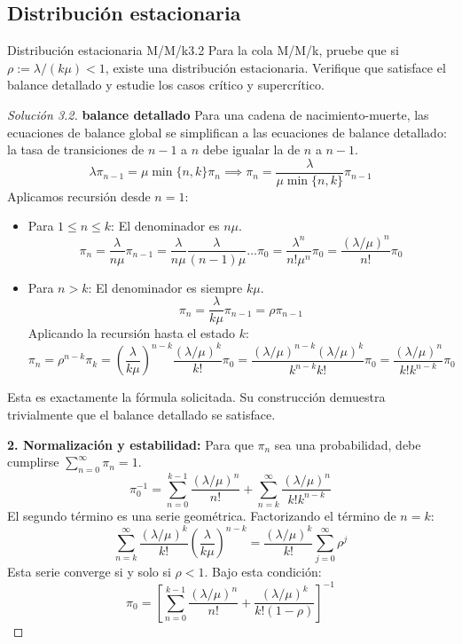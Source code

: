 \documentclass[10pt,a4paper]{article}
\begin{document}
\newpage
\subsection{Distribución estacionaria}

\begin{ejercicio}{Distribución estacionaria M/M/k}{3.2}
    Para la cola M/M/k, pruebe que si $\rho := \lambda/(k\mu) < 1$, existe una distribución estacionaria. Verifique que satisface el balance detallado y estudie los casos crítico y supercrítico.
\end{ejercicio}

\begin{proof}[Solución 3.2]
    \textbf{balance detallado}
    Para una cadena de nacimiento-muerte, las ecuaciones de balance global se simplifican a las ecuaciones de balance detallado: la tasa de transiciones de $n-1$ a $n$ debe igualar la de $n$ a $n-1$.
    \[ \lambda \pi_{n-1} = \mu \min\{n, k\} \pi_n \implies \pi_n = \frac{\lambda}{\mu \min\{n, k\}} \pi_{n-1} \]
    Aplicamos recursión desde $n=1$:
    \begin{itemize}
        \item Para $1 \le n \le k$: El denominador es $n\mu$.
        \[ \pi_n = \frac{\lambda}{n\mu} \pi_{n-1} = \frac{\lambda}{n\mu} \frac{\lambda}{(n-1)\mu} \dots \pi_0 = \frac{\lambda^n}{n! \mu^n} \pi_0 = \frac{(\lambda/\mu)^n}{n!} \pi_0 \]
        \item Para $n > k$: El denominador es siempre $k\mu$.
        \[ \pi_n = \frac{\lambda}{k\mu} \pi_{n-1} = \rho \pi_{n-1} \]
        Aplicando la recursión hasta el estado $k$:
        \[ \pi_n = \rho^{n-k} \pi_k = \left( \frac{\lambda}{k\mu} \right)^{n-k} \frac{(\lambda/\mu)^k}{k!} \pi_0 = \frac{(\lambda/\mu)^{n-k} (\lambda/\mu)^k}{k^{n-k} k!} \pi_0 = \frac{(\lambda/\mu)^n}{k! k^{n-k}} \pi_0 \]
    \end{itemize}
    Esta es exactamente la fórmula solicitada. Su construcción demuestra trivialmente que el balance detallado se satisface.

    \textbf{2. Normalización y estabilidad:}
    Para que $\pi_n$ sea una probabilidad, debe cumplirse $\sum_{n=0}^\infty \pi_n = 1$.
    \[ \pi_0^{-1} = \sum_{n=0}^{k-1} \frac{(\lambda/\mu)^n}{n!} + \sum_{n=k}^\infty \frac{(\lambda/\mu)^n}{k! k^{n-k}} \]
    El segundo término es una serie geométrica. Factorizando el término de $n=k$:
    \[ \sum_{n=k}^\infty \frac{(\lambda/\mu)^k}{k!} \left( \frac{\lambda}{k\mu} \right)^{n-k} = \frac{(\lambda/\mu)^k}{k!} \sum_{j=0}^\infty \rho^j \]
    Esta serie converge si y solo si $\rho < 1$. Bajo esta condición:
    \[ \pi_0 = \left[ \sum_{n=0}^{k-1} \frac{(\lambda/\mu)^n}{n!} + \frac{(\lambda/\mu)^k}{k!(1-\rho)} \right]^{-1} \]


\end{proof}
\end{document}
